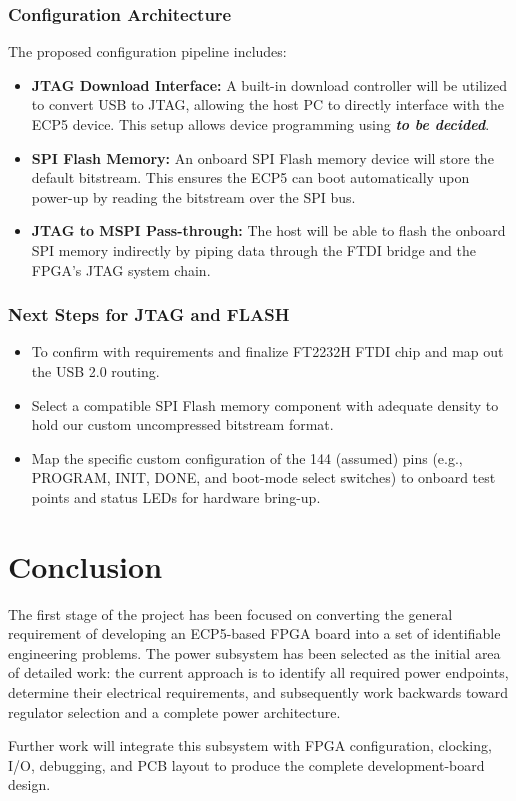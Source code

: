 \documentclass[12pt,a4paper]{article}
\begin{document}
\subsubsection{Configuration Architecture}
The proposed configuration pipeline includes:
\begin{itemize}[leftmargin=1cm]
    \item \textbf{JTAG Download Interface:} A built-in download controller will be utilized to convert USB to JTAG, allowing the host PC to directly interface with the ECP5 device. This setup allows device programming using \textit{\textbf{to be decided}}.
    \item \textbf{SPI Flash Memory:} An onboard SPI Flash memory device will store the default bitstream. This ensures the ECP5 can boot automatically upon power-up by reading the bitstream over the SPI bus.
    \item \textbf{JTAG to MSPI Pass-through:} The host will be able to flash the onboard SPI memory indirectly by piping data through the FTDI bridge and the FPGA's JTAG system  chain.
\end{itemize}

\subsubsection{Next Steps for JTAG and FLASH}
\begin{itemize}[leftmargin=1cm]
    \item To confirm with requirements and finalize FT2232H FTDI chip and map out the USB 2.0 routing.
    \item Select a compatible SPI Flash memory component with adequate density to hold our custom uncompressed bitstream format.
    \item Map the specific custom configuration of the 144 (assumed) pins (e.g., PROGRAM, INIT, DONE, and boot-mode select switches) to onboard test points and status LEDs for hardware bring-up.
\end{itemize}


\section{Conclusion}

The first stage of the project has been focused on converting the general requirement of developing an ECP5-based FPGA board into a set of identifiable engineering problems. The power subsystem has been selected as the initial area of detailed work: the current approach is to identify all required power endpoints, determine their electrical requirements, and subsequently work backwards toward regulator selection and a complete power architecture.

Further work will integrate this subsystem with FPGA configuration, clocking, I/O, debugging, and PCB layout to produce the complete development-board design.
\end{document}
